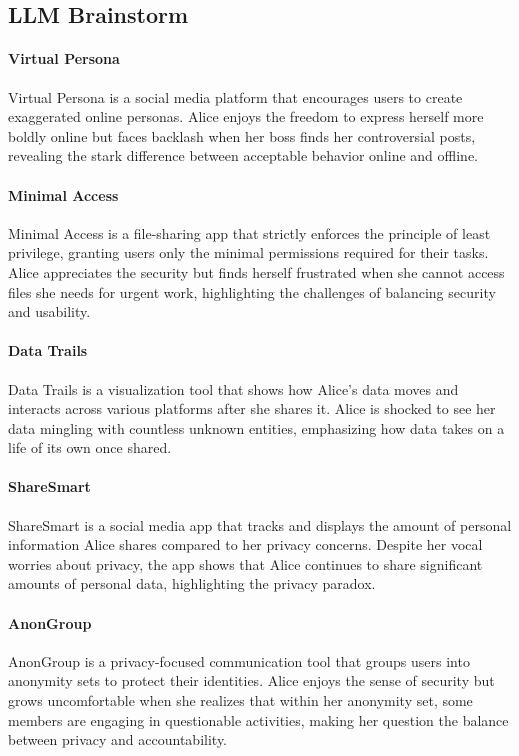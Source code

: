 \subsection{LLM Brainstorm}
\paragraph{Virtual Persona} 
Virtual Persona is a social media platform that encourages users to create exaggerated online personas. Alice enjoys the freedom to express herself more boldly online but faces backlash when her boss finds her controversial posts, revealing the stark difference between acceptable behavior online and offline.

\paragraph{Minimal Access}
Minimal Access is a file-sharing app that strictly enforces the principle of least privilege, granting users only the minimal permissions required for their tasks. Alice appreciates the security but finds herself frustrated when she cannot access files she needs for urgent work, highlighting the challenges of balancing security and usability.

\paragraph{Data Trails}
Data Trails is a visualization tool that shows how Alice's data moves and interacts across various platforms after she shares it. Alice is shocked to see her data mingling with countless unknown entities, emphasizing how data takes on a life of its own once shared.

\paragraph{ShareSmart}
ShareSmart is a social media app that tracks and displays the amount of personal information Alice shares compared to her privacy concerns. Despite her vocal worries about privacy, the app shows that Alice continues to share significant amounts of personal data, highlighting the privacy paradox.

\paragraph{AnonGroup}
AnonGroup is a privacy-focused communication tool that groups users into anonymity sets to protect their identities. Alice enjoys the sense of security but grows uncomfortable when she realizes that within her anonymity set, some members are engaging in questionable activities, making her question the balance between privacy and accountability.

